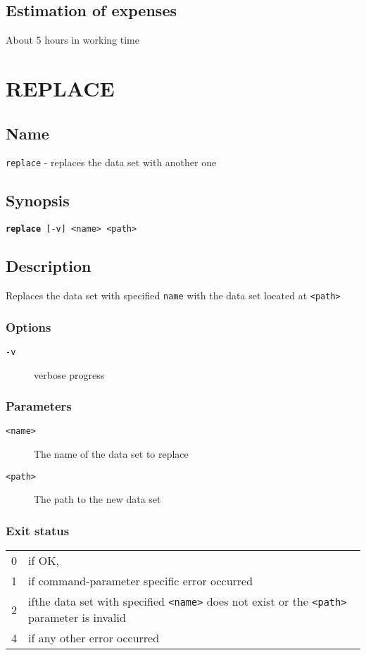 \documentclass{article} %
\begin{document}
		\subsection{Estimation of expenses}
		About 5 hours in working time
		
		\newpage
		\section*{REPLACE}
		\subsection*{Name}
		\texttt{replace} - replaces the data set with another one
		\subsection*{Synopsis}
		\texttt{\textbf{replace} [-v] <name> <path>}
		\subsection*{Description}
		Replaces the data set with specified \texttt{name} with the data set located at \texttt{<path>}\\
		
		\noindent
		\subsubsection*{Options}
		\begin{description}
			\item[\texttt{-v}] verbose progress
		\end{description}
		
		\subsubsection*{Parameters}
		\begin{description}
			\item[\texttt{<name>}] The name of the data set to replace
			\item[\texttt{<path>}] The path to the new data set
		\end{description}
		\subsubsection*{Exit status}
		\begin{tabular}{ll}
			0 &  if OK,\\ 
			1 &  if command-parameter specific error occurred\\
			2 &  ifthe data set with specified \texttt{<name>} does not exist or the \texttt{<path>} parameter is invalid\\
			4 &  if any other error occurred\\
		\end{tabular}
\end{document}
